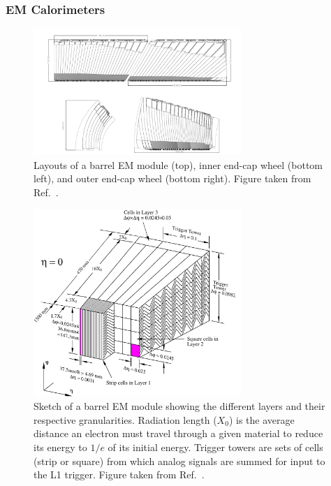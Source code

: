 \subsubsection{EM Calorimeters}
\begin{figure}[ht]
	\centerline{
		\includegraphics[width=0.7\textwidth]{figures/emmodules.pdf} 
	}
	\caption{Layouts of a barrel EM module (top), inner end-cap wheel (bottom left), and outer end-cap wheel (bottom right). Figure taken from Ref.~\cite{Aad:2008zzm}.  }
	\label{fig:emmodules}
\end{figure}

\begin{figure}[ht]
	\centerline{
		\includegraphics[width=0.7\textwidth]{figures/barrel_module.pdf} 
	}
	\caption{Sketch of a barrel EM module showing the different layers and their respective granularities. Radiation length ($X_{0}$) is the average distance an electron must travel through a given material to reduce its energy to $1/e$ of its initial energy. Trigger towers are sets of cells (strip or square) from which analog signals are summed for input to the L1 trigger. Figure taken from Ref.~\cite{Aad:2008zzm}.  }
	\label{fig:barrelemmodule}
\end{figure}

